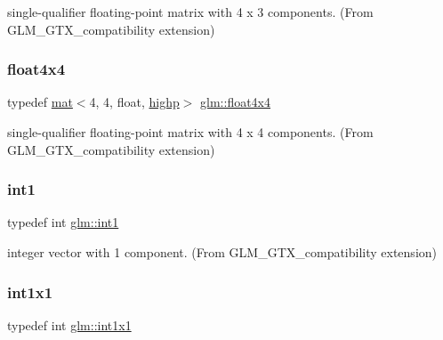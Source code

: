 single-\/qualifier floating-\/point matrix with 4 x 3 components. (From G\+L\+M\+\_\+\+G\+T\+X\+\_\+compatibility extension) 

\mbox{\label{group__gtx__compatibility_ga32ecd052006dea588730d2a077c5896c}} 
\subsubsection{\texorpdfstring{float4x4}{float4x4}}
{\footnotesize\ttfamily typedef \hyperlink{structglm_1_1mat}{mat}$<$4, 4, float, \hyperlink{namespaceglm_a36ed105b07c7746804d7fdc7cc90ff25ac6f7eab42eacbb10d59a58e95e362074}{highp}$>$ \hyperlink{group__gtx__compatibility_ga32ecd052006dea588730d2a077c5896c}{glm\+::float4x4}}



single-\/qualifier floating-\/point matrix with 4 x 4 components. (From G\+L\+M\+\_\+\+G\+T\+X\+\_\+compatibility extension) 

\mbox{\label{group__gtx__compatibility_gaba41d7803e4b24c17656d74377b88286}} 
\subsubsection{\texorpdfstring{int1}{int1}}
{\footnotesize\ttfamily typedef int \hyperlink{group__gtx__compatibility_gaba41d7803e4b24c17656d74377b88286}{glm\+::int1}}



integer vector with 1 component. (From G\+L\+M\+\_\+\+G\+T\+X\+\_\+compatibility extension) 

\mbox{\label{group__gtx__compatibility_ga09016a637a3cd093c22e6188080ac750}} 
\subsubsection{\texorpdfstring{int1x1}{int1x1}}
{\footnotesize\ttfamily typedef int \hyperlink{group__gtx__compatibility_ga09016a637a3cd093c22e6188080ac750}{glm\+::int1x1}}



